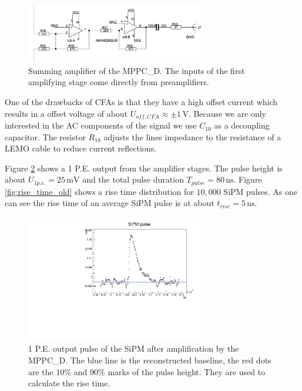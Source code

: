 \documentclass[]{article}
\begin{document}
	\begin{figure}[t]
		\centering
			\includegraphics[width=0.7\textwidth]{Figures/weinstock/sum_amp.png}
		\caption{Summing amplifier of the MPPC\_D. The inputs of the first amplifying stage come directly from preamplifiers.}
		\label{fig:sum_amp}
	\end{figure}	

	
One of the drawbacks of CFAs is that they have a high offset current which results in a offset voltage of about $U_{off,CFA}\approx \pm 1\,\text{V}$. Because we are only interested in the AC components of the signal we use $C_{10}$ as a decoupling capacitor. The resistor $R_{18}$ adjusts the lines impedance to the resistance of a LEMO cable to reduce current reflections.

Figure \ref{fig:sipm_pulse_old} shows a 1 P.E. output from the amplifier stages. The pulse height is about $U_{1p.e.} = 25\,\text{mV}$ and the total pulse duration $T_{pulse} = 80\,\text{ns}$. Figure \ref{fig:rise_time_old} shows a rise time distribution for $10,000$ SiPM pulses. As one can see the rise time of an average SiPM pulse is at about $t_{rise} = 5\,\text{ns}$.

	\begin{figure}[t]
		\centering
			\includegraphics[width=0.7\textwidth]{Figures/weinstock/old_amp_1pe.pdf}
		\caption{1 P.E. output pulse of the SiPM after amplification by the MPPC\_D. The blue line is the reconstructed baseline, the red dots are the $10\%$ and $90 \%$ marks of the pulse height. They are used to calculate the rise time.}
		\label{fig:sipm_pulse_old}
	\end{figure}
	
\end{document}
